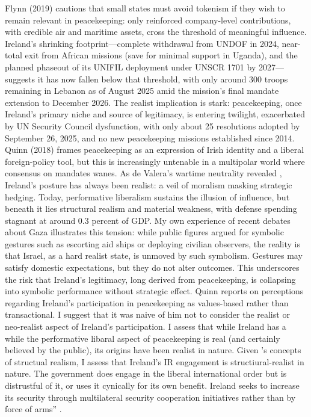 Flynn (2019)\nocite{FLYNN_2019} cautions that small states must avoid tokenism if they wish to remain relevant in peacekeeping: only reinforced company-level contributions, with credible air and maritime assets, cross the threshold of meaningful influence. Ireland’s shrinking footprint—complete withdrawal from UNDOF in 2024, near-total exit from African missions (save for minimal support in Uganda), and the planned phaseout of its UNIFIL deployment under UNSCR 1701 by 2027—suggests it has now fallen below that threshold, with only around 300 troops remaining in Lebanon as of August 2025 amid the mission's final mandate extension to December 2026. The realist implication is stark: peacekeeping, once Ireland’s primary niche and source of legitimacy, is entering twilight, exacerbated by UN Security Council dysfunction, with only about 25 resolutions adopted by September 26, 2025, and no new peacekeeping missions established since 2014. \nocite{QUINN_2018} Quinn (2018) frames peacekeeping as an expression of Irish identity and a liberal foreign-policy tool, but this is increasingly untenable in a multipolar world where consensus on mandates wanes. As de Valera’s wartime neutrality revealed \parencite{FANNING_2015,AYIOTIS_2023}, Ireland’s posture has always been realist: a veil of moralism masking strategic hedging. Today, performative liberalism sustains the illusion of influence, but beneath it lies structural realism and material weakness, with defense spending stagnant at around 0.3 percent of GDP. My own experience of recent debates about Gaza illustrates this tension: while public figures argued for symbolic gestures such as escorting aid ships or deploying civilian observers, the reality is that Israel, as a hard realist state, is unmoved by such symbolism. Gestures may satisfy domestic expectations, but they do not alter outcomes. This underscores the risk that Ireland’s legitimacy, long derived from peacekeeping, is collapsing into symbolic performance without strategic effect. Quinn \nocite{QUINN_2018} reports on perceptions regarding Ireland's participation in peacekeeping as values-based rather than transactional. I suggest that it was naive of him not to consider the realist or neo-realist aspect of Ireland's participation. I assess that while Ireland has a while the performative libaral aspect of peacekeeping is real (and certainly believed by the public), its origins have been realist in nature. Given \parencite{WALTZ_1979}'s concepts of structual realism, I assess that Ireland's IR engagement is structiural-realist in nature.  The government does engage in the liberal international order but is distrustful of it, or uses it cynically for its own benefit. Ireland seeks to 
increase its security through multilateral security cooperation initiatives rather than by force of  arms'' \parencite{TONRA_2007}.